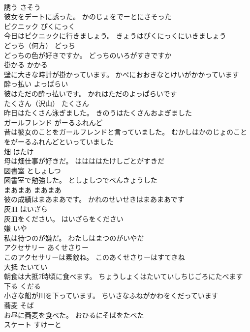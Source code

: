\documentclass[8pt]{extreport}
\begin{document}
\begin{CJK}{UTF8}{min}
\\	誘う	さそう	
\\	彼女をデートに誘った。	かのじょをでーとにさそった	
\\	ピクニック	ぴくにっく	
\\	今日はピクニックに行きましょう。	きょうはぴくにっくにいきましょう	
\\	どっち（何方）	どっち	
\\	どっちの色が好きですか。	どっちのいろがすきですか	
\\	掛かる	かかる	
\\	壁に大きな時計が掛かっています。	かべにおおきなとけいがかかっています	
\\	酔っ払い	よっぱらい	
\\	彼はただの酔っ払いです。	かれはただのよっぱらいです	
\\	たくさん（沢山）	たくさん	
\\	昨日はたくさん泳ぎました。	きのうはたくさんおよぎました	
\\	ガールフレンド	がーるふれんど	
\\	昔は彼女のことをガールフレンドと言っていました。	むかしはかのじょのことをがーるふれんどといっていました	
\\	畑	はたけ	
\\	母は畑仕事が好きだ。	ははははたけしごとがすきだ	
\\	図書室	としょしつ	
\\	図書室で勉強した。	としょしつでべんきょうした	
\\	まあまあ	まあまあ	
\\	彼の成績はまあまあです。	かれのせいせきはまあまあです	
\\	灰皿	はいざら	
\\	灰皿をください。	はいざらをください	
\\	嫌	いや	
\\	私は待つのが嫌だ。	わたしはまつのがいやだ	
\\	アクセサリー	あくせさりー	
\\	このアクセサリーは素敵ね。	このあくせさりーはすてきね	
\\	大抵	たいてい	
\\	朝食は大抵7時頃に食べます。	ちょうしょくはたいていしちじごろにたべます	
\\	下る	くだる	
\\	小さな船が川を下っています。	ちいさなふねがかわをくだっています	
\\	蕎麦	そば	
\\	お昼に蕎麦を食べた。	おひるにそばをたべた	
\\	スケート	すけーと	

\end{CJK}
\end{document}
